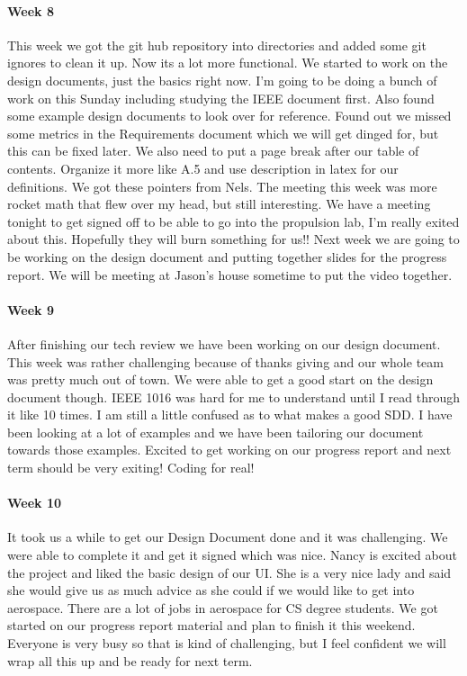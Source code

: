 \documentclass[10pt,draftclsnofoot,onecolumn,retainorgcmds]{IEEEtran}
\begin{document}
\paragraph{Week 8}
This week we got the git hub repository into directories and added some git ignores to clean it up. Now its a lot more functional. We started to work on the design documents, just the basics right now. I'm going to be doing a bunch of work on this Sunday including studying the IEEE document first. Also found some example design documents to look over for reference. Found out we missed some metrics in the Requirements document which we will get dinged for, but this can be fixed later. We also need to put a page break after our table of contents. Organize it more like A.5 and use description in latex for our definitions. We got these pointers from Nels. The meeting this week was more rocket math that flew over my head, but still interesting. We have a meeting tonight to get signed off to be able to go into the propulsion lab, I'm really exited about this. Hopefully they will burn something for us!! Next week we are going to be working on the design document and putting together slides for the progress report. We will be meeting at Jason's house sometime to put the video together.\\
\paragraph{Week 9}
After finishing our tech review we have been working on our design document. This week was rather challenging because of thanks giving and our whole team was pretty much out of town. We were able to get a good start on the design document though. IEEE 1016 was hard for me to understand until I read through it like 10 times. I am still a little confused as to what makes a good SDD. I have been looking at a lot of examples and we have been tailoring our document towards those examples. Excited to get working on our progress report and next term should be very exiting! Coding for real!\\
\paragraph{Week 10}
It took us a while to get our Design Document done and it was challenging. We were able to complete it and get it signed which was nice. Nancy is excited about the project and liked the basic design of our UI. She is a very nice lady and said she would give us as much advice as she could if we would like to get into aerospace. There are a lot of jobs in aerospace for CS degree students. We got started on our progress report material and plan to finish it this weekend. Everyone is very busy so that is kind of challenging, but I feel confident we will wrap all this up and be ready for next term. \\
\end{document}
